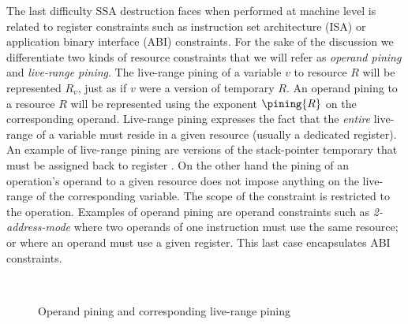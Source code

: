 The last difficulty SSA destruction faces when performed at machine level is related to register constraints such as instruction set architecture (ISA) or application binary interface (ABI) constraints. For the sake of the discussion we differentiate two kinds of resource constraints that we will refer as \emph{operand pining} and \emph{live-range pining}. The live-range pining of a variable $v$ to resource $R$ will be represented $R_v$, just as if $v$ were a version of temporary $R$. An operand pining to a resource $R$ will be represented using the exponent $\pining{R}$ on the corresponding operand. 
Live-range pining expresses the fact that the \emph{entire} live-range of a variable must reside in a given resource (usually a dedicated register). An example of live-range pining are versions of the stack-pointer temporary that must be assigned back to register \SP. On the other hand the pining of an operation's operand to a given resource does not impose anything on the live-range of the corresponding variable. The scope of the constraint is restricted to the operation. Examples of operand pining are operand constraints such as \emph{2-address-mode} where two operands of one instruction must use the same resource; or where an operand must use a given register. This last case encapsulates ABI constraints. 
\begin{figure}[h]
\hfill
{}
\\
\hfill
{}
\caption{\label{fig:alternative_ssa_destruction:pining}Operand pining and corresponding live-range pining}
\end{figure}

